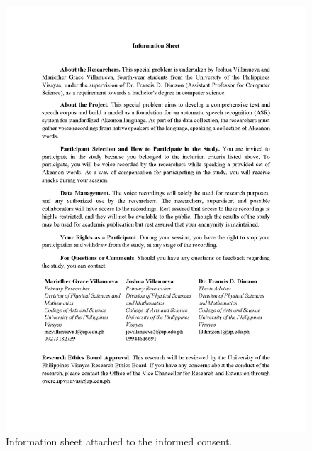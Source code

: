 \begin{figure}[h!]
    \centering
    \includegraphics[width=\textwidth]{./appendix/informed-consent-2.png}
    \caption{Information sheet attached to the informed consent.}
    \label{fig:bible}
\end{figure}
